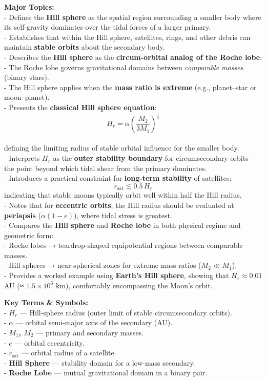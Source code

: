 \documentclass[
  letterpaper,
]{book}
\begin{document}
\textbf{Major Topics:}\\
- Defines the \textbf{Hill sphere} as the spatial region surrounding a
smaller body where its self-gravity dominates over the tidal forces of a
larger primary.\\
- Establishes that within the Hill sphere, satellites, rings, and other
debris can maintain \textbf{stable orbits} about the secondary body.\\
- Describes the \textbf{Hill sphere} as the \textbf{circum-orbital
analog of the Roche lobe}:\\
- The Roche lobe governs gravitational domains between \emph{comparable
masses} (binary stars).\\
- The Hill sphere applies when the \textbf{mass ratio is extreme} (e.g.,
planet--star or moon--planet).\\
- Presents the \textbf{classical Hill sphere equation}:\\
\[
  H_r = \alpha\!\left(\frac{M_2}{3M_1}\right)^{\!\tfrac{1}{3}}
  \]\\
defining the limiting radius of stable orbital influence for the smaller
body.\\
- Interprets \(H_r\) as the \textbf{outer stability boundary} for
circumsecondary orbits --- the point beyond which tidal shear from the
primary dominates.\\
- Introduces a practical constraint for \textbf{long-term stability} of
satellites:\\
\[
  r_{\text{sat}} \lesssim 0.5\,H_r
  \] indicating that stable moons typically orbit well within half the
Hill radius.\\
- Notes that for \textbf{eccentric orbits}, the Hill radius should be
evaluated at \textbf{periapsis} (\(\alpha(1 - e)\)), where tidal stress
is greatest.\\
- Compares the \textbf{Hill sphere} and \textbf{Roche lobe} in both
physical regime and geometric form:\\
- Roche lobes → teardrop-shaped equipotential regions between comparable
masses.\\
- Hill spheres → near-spherical zones for extreme mass ratios
(\(M_2 \ll M_1\)).\\
- Provides a worked example using \textbf{Earth's Hill sphere}, showing
that \(H_r \approx 0.01\) AU (≈ \(1.5×10^6\) km), comfortably
encompassing the Moon's orbit.

\textbf{Key Terms \& Symbols:}\\
- \textbf{\(H_r\)} --- Hill-sphere radius (outer limit of stable
circumsecondary orbits).\\
- \textbf{\(\alpha\)} --- orbital semi-major axis of the secondary
(AU).\\
- \textbf{\(M_1\), \(M_2\)} --- primary and secondary masses.\\
- \textbf{\(e\)} --- orbital eccentricity.\\
- \textbf{\(r_{\text{sat}}\)} --- orbital radius of a satellite.\\
- \textbf{Hill Sphere} --- stability domain for a low-mass secondary.\\
- \textbf{Roche Lobe} --- mutual gravitational domain in a binary pair.
\end{document}
